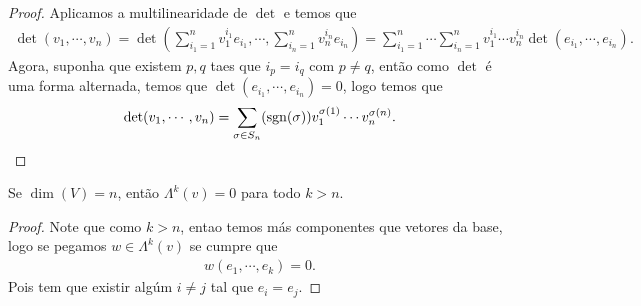 \begin{proof}
  Aplicamos a multilinearidade de $\det$ e temos que
  \begin{align*}
    \det(v_1,\cdots,v_n)=\det\left( \sum_{i_1=1}^{n}v_{1}^{i_1}e_{i_1},\cdots, \sum_{i_n=1}^{n}v_{n}^{i_n}e_{i_n}\right)=\sum_{i_1=1}^{n}\cdots\sum_{i_n=1}^{n}v_{1}^{i_1}\cdots v_{n}^{i_n}\det(e_{i_1},\cdots,e_{i_n}).
  \end{align*}
  Agora, suponha que existem $p,q$ taes que $i_p=i_q$ com $p\neq q$, então como $\det$ é uma forma alternada, temos que $\det(e_{i_1},\cdots,e_{i_n})=0$, logo temos que
  \begin{align*}
    \det(v_1,\cdots,v_n)=\sum_{\sigma\in S_n}(\operatorname{sgn}(\sigma))v_1^{\sigma(1)}\cdots v_{n}^{\sigma(n)}.
  \end{align*}
\end{proof}
\begin{proposition}
  Se $\dim(V)=n$, então $\Lambda^{k}(v)=0$ para todo $k>n$. 
\end{proposition}
\begin{proof} 
  Note que como $k>n$, entao temos más componentes que vetores da base, logo se pegamos $w\in\Lambda^{k}(v)$ se cumpre que
  \begin{align*}
    w(e_1,\cdots,e_k)=0.
  \end{align*}
  Pois tem que existir algúm $i\neq j$ tal que $e_i=e_j$. 
\end{proof}
